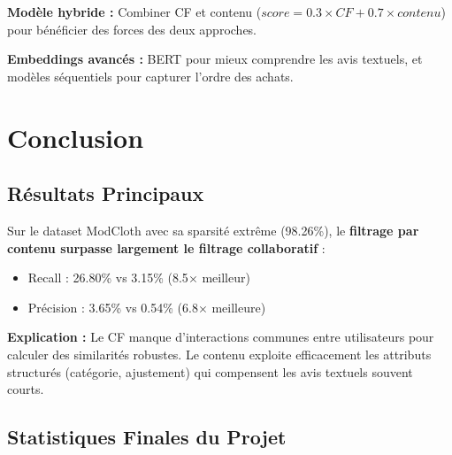 \documentclass[12pt,a4paper]{article}
\begin{document}
\textbf{Modèle hybride :} Combiner CF et contenu ($score = 0.3 \times CF + 0.7 \times contenu$) pour bénéficier des forces des deux approches.

\textbf{Embeddings avancés :} BERT pour mieux comprendre les avis textuels, et modèles séquentiels pour capturer l'ordre des achats.

\section{Conclusion}

\subsection{Résultats Principaux}

Sur le dataset ModCloth avec sa sparsité extrême (98.26\%), le \textbf{filtrage par contenu surpasse largement le filtrage collaboratif} :

\begin{itemize}
    \item Recall : 26.80\% vs 3.15\% (8.5$\times$ meilleur)
    \item Précision : 3.65\% vs 0.54\% (6.8$\times$ meilleure)
\end{itemize}

\textbf{Explication :} Le CF manque d'interactions communes entre utilisateurs pour calculer des similarités robustes. Le contenu exploite efficacement les attributs structurés (catégorie, ajustement) qui compensent les avis textuels souvent courts.

\subsection{Statistiques Finales du Projet}
\end{document}
